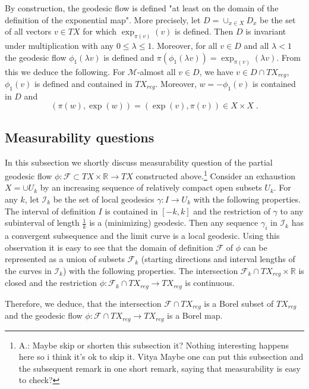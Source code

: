 \documentclass[12pt,leqno]{amsart}
\numberwithin{equation}{section}
\theoremstyle{definition}
\theoremstyle{remark}
\newcommand{\R}{\mathbb{R}}
\begin{document}
By construction, the geodesic flow is defined "at least on the domain of the definition of the exponential map".
More precisely, let $D=\cup _{x\in X} D_x$ be the set of all vectors $v\in TX$ for which $\exp _{\pi(v)} (v)$ is defined.
Then $D$ is invariant under multiplication with any $0\leq \lambda \leq 1$.  Moreover, for all $v\in D$ and all $\lambda <1$
the geodesic flow $\phi_1 (\lambda v)$ is defined and $\pi (\phi_1 (\lambda v))=  \exp _{\pi (v)} (\lambda v)$.
From this we deduce the following.
 For $\mathcal M$-almost all $v\in D$, we have $v\in D\cap TX_{reg}$, $\phi _1(v)$ is defined  and contained in $TX_{reg}$. Moreover,
 $w=-\phi_1 (v)$ is contained in $D$  and
\begin{equation} \label{eq:symm}
(\pi (w), \exp (w))=(\exp (v), \pi (v)) \in X\times X\; .
\end{equation}


\subsection{Measurability questions} \label{subsec:measur}
 In this subsection we shortly discuss measurability question of the partial geodesic flow
$\phi:\mathcal F\subset TX\times \R \to TX$ constructed above.\footnote{A.:  Maybe skip or shorten this subsection it?{\color{red} Nothing interesting happens here so i think it's ok to skip it. Vitya}   Maybe one can put this subsection and the subsequent remark in one short remark, saying that
measurability is easy to check?}
Consider an exhaustion  $X=\cup U_k$ by an increasing sequence of relatively compact open subsets $U_k$.  For any $k$, let $\mathcal I_k$ be the set of local geodesics $\gamma :I\to U_k$ with the following properties. The interval of definition $I$ is contained in $[- k , k]$  and the restriction of $\gamma$ to any subinterval of length $\frac 1 k$ is a (minimizing) geodesic. Then any sequence $\gamma _i$ in $\mathcal I_k$ has a convergent subsequence and the limit curve is a local geodesic.  Using this observation it is easy to see that the domain of definition $\mathcal F$
of $\phi$ can be represented as a union of subsets  $\mathcal F_k$  (starting directions and interval lengths of the curves in $\mathcal I_k$) with the following properties. The intersection  $\mathcal F_k \cap TX_{reg} \times \R$ is closed and the restriction $\phi:\mathcal F_k \cap TX_{reg} \to TX_{reg}$ is continuous.

Therefore, we deduce, that the intersection $\mathcal F\cap TX_{reg}$ is a Borel subset of $TX_{reg}$ and the geodesic flow
$\phi :\mathcal F\cap TX_{reg} \to TX_{reg}$ is a Borel map.
\end{document}
